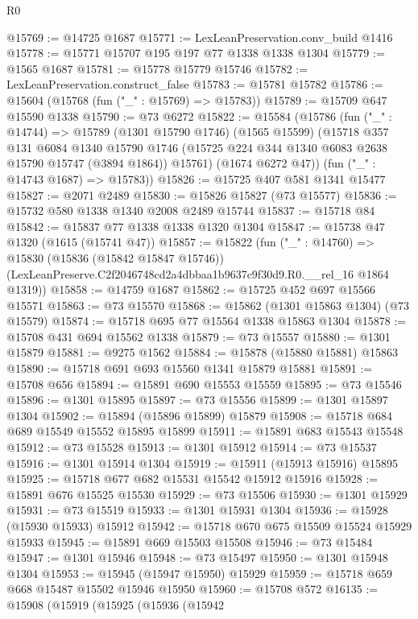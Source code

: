 \begin{lexlean}{R0}
\begin{coremodule}
@15769 := @14725 @1687
@15771 := LexLeanPreservation.conv_build @1416
@15778 := @15771 @15707 @195 @197 @77 @1338 @1338 @1304
@15779 := @1565 @1687
@15781 := @15778 @15779 @15746
@15782 := LexLeanPreservation.construct_false
@15783 := @15781 @15782
@15786 := @15604 (@15768 (fun ("_" : @15769) => @15783))
@15789 := @15709 @647 @15590 @1338
@15790 := @73 @6272
@15822 := @15584
    (@15786
      (fun ("_" : @14744) =>
      @15789
        (@1301 @15790 @1746)
        (@1565 @15599)
        (@15718
          @357
          @131
          @6084
          @1340
          @15790
          @1746
          (@15725 @224 @344 @1340 @6083 @2638 @15790 @15747 (@3894 @1864))
          @15761)
        (@1674 @6272 @47))
      (fun ("_" : @14743 @1687) => @15783))
@15826 := @15725 @407 @581 @1341 @15477
@15827 := @2071 @2489
@15830 := @15826 @15827 (@73 @15577)
@15836 := @15732 @580 @1338 @1340 @2008 @2489 @15744
@15837 := @15718 @84
@15842 := @15837 @77 @1338 @1338 @1320 @1304
@15847 := @15738 @47 @1320 (@1615 (@15741 @47))
@15857 := @15822
    (fun ("_" : @14760) =>
    @15830
      (@15836 (@15842 @15847 @15746))
      (LexLeanPreserve.C2f2046748cd2a4dbbaa1b9637c9f30d9.R0.__rel_16 @1864 @1319))
@15858 := @14759 @1687
@15862 := @15725 @452 @697 @15566 @15571
@15863 := @73 @15570
@15868 := @15862 (@1301 @15863 @1304) (@73 @15579)
@15874 := @15718 @695 @77 @15564 @1338 @15863 @1304
@15878 := @15708 @431 @694 @15562 @1338
@15879 := @73 @15557
@15880 := @1301 @15879
@15881 := @9275 @1562
@15884 := @15878 (@15880 @15881) @15863
@15890 := @15718 @691 @693 @15560 @1341 @15879 @15881
@15891 := @15708 @656
@15894 := @15891 @690 @15553 @15559
@15895 := @73 @15546
@15896 := @1301 @15895
@15897 := @73 @15556
@15899 := @1301 @15897 @1304
@15902 := @15894 (@15896 @15899) @15879
@15908 := @15718 @684 @689 @15549 @15552 @15895 @15899
@15911 := @15891 @683 @15543 @15548
@15912 := @73 @15528
@15913 := @1301 @15912
@15914 := @73 @15537
@15916 := @1301 @15914 @1304
@15919 := @15911 (@15913 @15916) @15895
@15925 := @15718 @677 @682 @15531 @15542 @15912 @15916
@15928 := @15891 @676 @15525 @15530
@15929 := @73 @15506
@15930 := @1301 @15929
@15931 := @73 @15519
@15933 := @1301 @15931 @1304
@15936 := @15928 (@15930 @15933) @15912
@15942 := @15718 @670 @675 @15509 @15524 @15929 @15933
@15945 := @15891 @669 @15503 @15508
@15946 := @73 @15484
@15947 := @1301 @15946
@15948 := @73 @15497
@15950 := @1301 @15948 @1304
@15953 := @15945 (@15947 @15950) @15929
@15959 := @15718 @659 @668 @15487 @15502 @15946 @15950
@15960 := @15708 @572
@16135 := @15908
    (@15919
      (@15925
        (@15936
          (@15942

\end{coremodule}
\end{lexlean}
